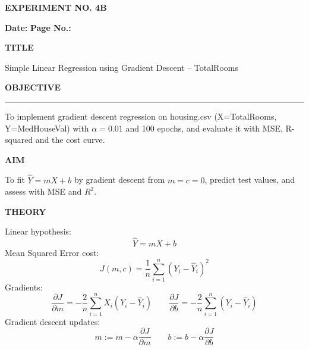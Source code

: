 \documentclass[11pt,twoside]{article}
\newcommand{\expheading}[1]{{\fontsize{14}{17}\selectfont\textbf{#1}\par}}
\newcommand{\fullrule}{\noindent\rule{\textwidth}{0.6pt}\par}
\begin{document}
{\setlength{\parskip}{1pt}\setlength{\abovedisplayskip}{2pt}\setlength{\belowdisplayskip}{2pt}
\begin{center}
\expheading{EXPERIMENT NO. 4B}
\end{center}
\vspace{2pt}

\noindent\textbf{Date:} \underline{\hspace{2.6cm}} \hfill \textbf{Page No.:} \underline{\hspace{2.6cm}}\par
\vspace{6pt}

\expheading{TITLE}
\vspace{4pt}
\noindent Simple Linear Regression using Gradient Descent -- TotalRooms\par
\vspace{4pt}

\expheading{OBJECTIVE}
\vspace{2pt}
\fullrule
\vspace{4pt}
\noindent To implement gradient descent regression on housing.csv (X=TotalRooms, Y=MedHouseVal) with $\alpha=0.01$ and 100 epochs, and evaluate it with MSE, R-squared and the cost curve. \par
\vspace{4pt}

\expheading{AIM}
\vspace{4pt}
\noindent To fit $\hat{Y}=mX+b$ by gradient descent from $m=c=0$, predict test values, and assess with MSE and $R^2$. \par
\vspace{4pt}

\expheading{THEORY}
\vspace{4pt}
Linear hypothesis:
\[\hat{Y}=mX+b\]
Mean Squared Error cost:
\[J(m,c)=\frac{1}{n}\sum_{i=1}^{n}(Y_i-\hat{Y}_i)^2\]
Gradients:
\[\frac{\partial J}{\partial m}=-\frac{2}{n}\sum_{i=1}^{n}X_i(Y_i-\hat{Y}_i)\qquad \frac{\partial J}{\partial b}=-\frac{2}{n}\sum_{i=1}^{n}(Y_i-\hat{Y}_i)\]
Gradient descent updates:
\[m:=m-\alpha\frac{\partial J}{\partial m}\qquad b:=b-\alpha\frac{\partial J}{\partial b}\]
\vspace{4pt}

}
\end{document}
